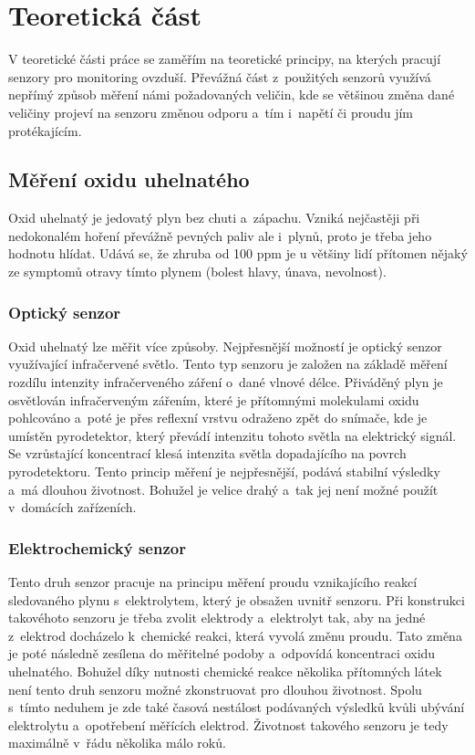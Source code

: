 \chapter{Teoretická část}

V teoretické části práce se zaměřím na teoretické principy, na kterých pracují senzory pro monitoring ovzduší. Převážná část z~použitých senzorů využívá nepřímý způsob měření námi požadovaných veličin, kde se většinou změna dané veličiny projeví na senzoru změnou odporu a~tím i~napětí či proudu jím protékajícím.

\section{Měření oxidu uhelnatého}

Oxid uhelnatý je jedovatý plyn bez chuti a~zápachu. Vzniká nejčastěji při nedokonalém hoření převážně pevných paliv ale i~plynů, proto je třeba jeho hodnotu hlídat. Udává se, že zhruba od 100 ppm je u většiny lidí přítomen nějaký ze symptomů otravy tímto plynem (bolest hlavy, únava, nevolnost).

\subsection{Optický senzor}

Oxid uhelnatý lze měřit více způsoby. Nejpřesnější možností je optický senzor využívající infračervené světlo. Tento typ senzoru je založen na základě měření rozdílu intenzity infračerveného záření o~dané vlnové délce. Přiváděný plyn je osvětlován infračerveným zářením, které je přítomnými molekulami oxidu pohlcováno a~poté je přes reflexní vrstvu odraženo zpět do snímače, kde je umístěn pyrodetektor, který převádí intenzitu tohoto světla na elektrický signál. Se vzrůstající koncentrací klesá intenzita světla dopadajícího na povrch pyrodetektoru. Tento princip měření je nejpřesnější, podává stabilní výsledky a~má dlouhou životnost. Bohužel je velice drahý a~tak jej není možné použít v~domácích zařízeních.

\subsection{Elektrochemický senzor}

Tento druh senzor pracuje na principu měření proudu vznikajícího reakcí sledovaného plynu s~elektrolytem, který je obsažen uvnitř senzoru. Při konstrukci takovéhoto senzoru je třeba zvolit elektrody a~elektrolyt tak, aby na jedné z~elektrod docházelo k~chemické reakci, která vyvolá změnu proudu. Tato změna je poté následně zesílena do měřitelné podoby a~odpovídá koncentraci oxidu uhelnatého. Bohužel díky nutnosti chemické reakce několika přítomných látek není tento druh senzoru možné zkonstruovat pro dlouhou životnost. Spolu s~tímto neduhem je zde také časová nestálost podávaných výsledků kvůli ubývání elektrolytu a~opotřebení měřících elektrod. Životnost takového senzoru je tedy maximálně v~řádu několika málo roků. 

